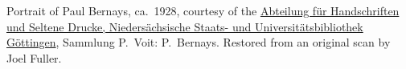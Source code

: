 Portrait of Paul Bernays, ca.~1928, courtesy of
the \href{http://www.sub.uni-goettingen.de/en/contact/departments-a-z/departmental-and-unit-details/abteilunggruppe/handschriften-und-seltene-drucke/}{Abteilung
f\"ur Handschriften und Seltene Drucke, Nieders\"achsische Staats- und
Universit\"atsbibliothek G\"ottingen}, Sammlung P.~Voit:
P.~Bernays. Restored from an original scan by Joel Fuller.
